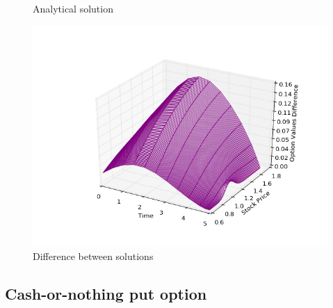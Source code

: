\documentclass[11pt,a4paper]{extarticle}
\begin{document}
\begin{minipage}{\linewidth}
\begin{minipage}{0.29\linewidth}
\begin{figure}[H]
              \caption{Analytical solution}
          \end{figure}
      \end{minipage}
      \hspace{0.04\linewidth}
      \begin{minipage}{0.29\linewidth}
          \begin{figure}[H]
              \includegraphics[width=\linewidth]{Figures/c-o-n-call-dif}
              \caption{Difference between solutions}
          \end{figure}
      \end{minipage}
\end{minipage}

\subsection{Cash-or-nothing put option}
\end{document}

